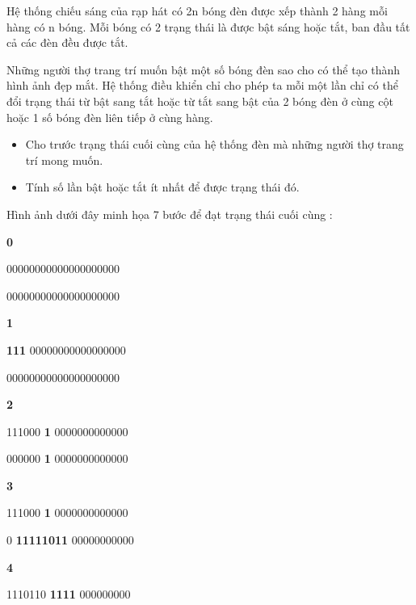 Hệ thống chiếu sáng của rạp hát có 2n bóng đèn được xếp thành 2 hàng mỗi hàng có n bóng. Mỗi bóng có 2 trạng thái là được bật sáng hoặc tắt, ban đầu tất cả các đèn đều được tắt.  

   Những người thợ trang trí muốn bật một số bóng đèn sao cho có thể tạo thành hình ảnh đẹp mắt. Hệ thống điều khiển chỉ cho phép ta mỗi một lần chỉ có thể đổi trạng thái từ bật sang tắt hoặc từ tắt sang bật của 2 bóng đèn ở cùng cột hoặc 1 số bóng đèn liên tiếp ở cùng hàng.
\begin{itemize}
	\item     Cho trước trạng thái cuối cùng của hệ thống đèn mà những người thợ trang trí mong muốn.   
	\item     Tính số lần bật hoặc tắt ít nhất để được trạng thái đó.   
\end{itemize}









   Hình ảnh dưới đây minh họa 7 bước để đạt trạng thái cuối cùng :  



\textbf{          0         }

         00000000000000000000                          

         00000000000000000000                          

\textbf{          1         }

\textbf{          111         }         00000000000000000                          

         00000000000000000000                          

\textbf{          2         }

         111000         \textbf{          1         }         0000000000000                          

         000000         \textbf{          1         }         0000000000000                          

\textbf{          3         }

         111000         \textbf{          1         }         0000000000000        

         0         \textbf{          11111011         }         00000000000                          

\textbf{          4         }

         1110110         \textbf{          1111         }         000000000                          

